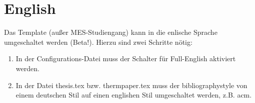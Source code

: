 %
\section{English}\label{sec:english}
Das Template (außer MES-Studiengang) kann in die enlische Sprache umgeschaltet werden (Beta!). Hierzu sind zwei Schritte nötig:

\begin{enumerate}
\item In der Configurations-Datei muss der Schalter für Full-English aktiviert werden.
\item In der Datei thesis.tex bzw. thermpaper.tex muss der bibliographystyle von einem deutschen Stil auf einen englishen Stil umgeschaltet werden, z.B. acm.
\end{enumerate}

